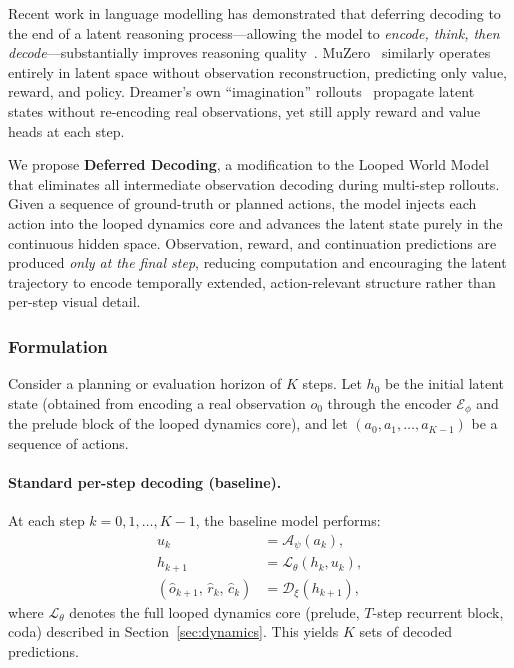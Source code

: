 Recent work in language modelling has demonstrated that deferring decoding to the end of a latent reasoning process---allowing the model to \emph{encode, think, then decode}---substantially improves reasoning quality~\citep{koishekenov2025etd,geiping2025rdm,saunshi2025latentthoughts}. MuZero~\citep{schrittwieser2020muzero} similarly operates entirely in latent space without observation reconstruction, predicting only value, reward, and policy.  Dreamer's own ``imagination'' rollouts~\citep{hafner2020dreamerv1} propagate latent states without re-encoding real observations, yet still apply reward and value heads at each step.

We propose \textbf{Deferred Decoding}, a modification to the Looped World Model that eliminates all intermediate observation decoding during multi-step rollouts. Given a sequence of ground-truth or planned actions, the model injects each action into the looped dynamics core and advances the latent state purely in the continuous hidden space.  Observation, reward, and continuation predictions are produced \emph{only at the final step}, reducing computation and encouraging the latent trajectory to encode temporally extended, action-relevant structure rather than per-step visual detail.

\subsubsection{Formulation}

Consider a planning or evaluation horizon of $K$ steps. Let $h_0$ be the initial latent state (obtained from encoding a real observation $o_0$ through the encoder $\mathcal{E}_\phi$ and the prelude block of the looped dynamics core), and let $(a_0, a_1, \ldots, a_{K-1})$ be a sequence of actions.

\paragraph{Standard per-step decoding (baseline).}
At each step $k = 0, 1, \ldots, K-1$, the baseline model performs:
\begin{align}
  u_k &= \mathcal{A}_\psi(a_k), \label{eq:dd_action} \\
  h_{k+1} &= \mathcal{L}_\theta(h_k, u_k),  \label{eq:dd_dynamics} \\
  (\hat{o}_{k+1},\, \hat{r}_k,\, \hat{c}_k) &= \mathcal{D}_\xi(h_{k+1}),
  \label{eq:dd_decode_all}
\end{align}
where $\mathcal{L}_\theta$ denotes the full looped dynamics core (prelude, $T$-step recurrent block, coda) described in Section~\ref{sec:dynamics}. This yields $K$ sets of decoded predictions.

